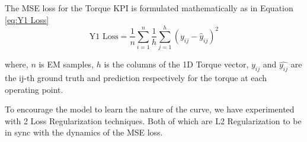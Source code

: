 \documentclass{report} %
\begin{document}
The \ac{MSE} loss for the Torque \ac{KPI} is formulated mathematically as in Equation \ref{eq:Y1 Loss}
\begin{equation}
    \text{Y1 Loss} = \frac{1}{n} \sum_{i=1}^{n} \frac{1}{h} \sum_{j=1}^{h} (y_{ij} - \hat{y}_{ij})^2
    \label{eq:Y1 Loss}
\end{equation} 

where, \(n\) is \ac{EM} samples, \(h\) is the columns of the 1D Torque vector, \(y_{ij}\) and $\hat{y_{ij}}$ are the ij-th ground truth and prediction respectively for 
the torque at each operating point.

To encourage the model to learn the nature of the curve, we have experimented with 2 Loss Regularization techniques. 
Both of which are L2 Regularization to be in sync with the dynamics of the \ac{MSE} loss.
\end{document}
